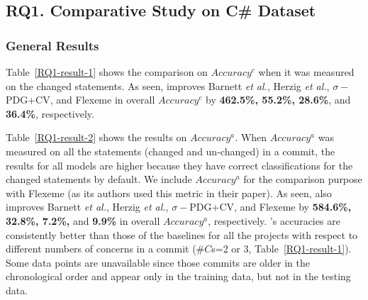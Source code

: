 \subsection{{\bf RQ1. Comparative Study on C\# Dataset}}
\label{rq1:sec}

\subsubsection{General Results} Table~\ref{RQ1-result-1} shows the comparison on $Accuracy^{c}$ when
it was measured on the changed statements. As seen, {\tool} improves
Barnett {\em et al.}, Herzig {\em et al.}, $\sigma-$PDG+CV, and
Flexeme in overall $Accuracy^c$ by {\bf 462.5\%, 55.2\%, 28.6\%}, and
{\bf 36.4\%}, respectively.

Table~\ref{RQ1-result-2} shows the results on $Accuracy^{a}$. When
$Accuracy^{a}$ was measured on all the statements (changed and
un-changed) in a commit, the results for all models are higher because
they have correct classifications for the changed statements by
default. We include $Accuracy^{a}$ for the comparison purpose with
Flexeme (as its authors used this metric in their paper). As seen,
{\tool} also improves Barnett {\em et al.}, Herzig {\em et al.},
$\sigma-$PDG+CV, and Flexeme by {\bf 584.6\%, 32.8\%, 7.2\%,} and {\bf
9.9\%} in overall $Accuracy^{a}$, respectively. {\tool}'s accuracies
are consistently better than those of the baselines for all the
projects with respect to different numbers of concerns in a commit
($\#C$s=2 or 3, Table~\ref{RQ1-result-1}). Some data points are
unavailable since those commits are older in the chronological order
and appear only in the training data, but not in the testing data.

